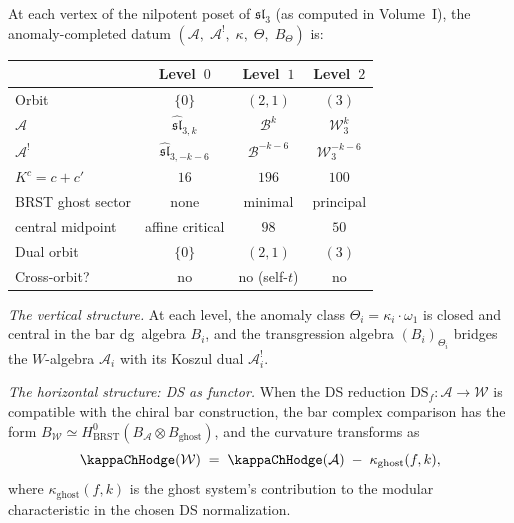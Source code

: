 \begin{construction}
\label{constr:sl3-anomaly-chain}
At each vertex of the nilpotent poset of $\mathfrak{sl}_3$
\textup{(}as computed in Volume~I\textup{)}, the
anomaly-completed datum
$(\mathcal A,\;\mathcal A^!,\;\kappa,\;\Theta,\;B_\Theta)$
is:
\begin{center}
\renewcommand{\arraystretch}{1.3}
\begin{tabular}{lccc}
& \textbf{Level~$0$} & \textbf{Level~$1$} & \textbf{Level~$2$} \\
\hline
Orbit & $\{0\}$ & $(2,1)$ & $(3)$ \\[2pt]
$\mathcal A$ &
 $\widehat{\mathfrak{sl}}_{3,k}$ &
 $\mathcal B^k$ &
 $\mathcal W_3^k$ \\[2pt]
$\mathcal A^!$ &
 $\widehat{\mathfrak{sl}}_{3,-k-6}$ &
 $\mathcal B^{-k-6}$ &
 $\mathcal W_3^{-k-6}$ \\[2pt]
$K^c=c+c'$ & $16$ & $196$ & $100$ \\[2pt]
BRST ghost sector & none & minimal & principal \\[2pt]
central midpoint & affine critical & $98$ & $50$ \\[2pt]
Dual orbit & $\{0\}$ & $(2,1)$ & $(3)$ \\[2pt]
Cross-orbit? & no & no (self-$t$) & no
\end{tabular}
\end{center}

\emph{The vertical structure.}
At each level, the anomaly class $\Theta_i=\kappa_i\cdot\omega_1$
is closed and central in the bar dg~algebra $B_i$, and the
transgression algebra $(B_i)_{\Theta_i}$ bridges the
$W$-algebra $\mathcal A_i$ with its Koszul dual
$\mathcal A_i^!$.

\emph{The horizontal structure: DS as functor.}
When the DS reduction $\mathrm{DS}_f\colon\mathcal A\to\mathcal W$
is compatible with the chiral bar construction, the bar complex
comparison has the form
$B_{\mathcal W}\simeq H^0_{\mathrm{BRST}}(B_{\mathcal A}
\otimes B_{\mathrm{ghost}})$,
and the curvature transforms as
\begin{equation}\label{eq:curvature-ds-transform}
\kappaChHodge(\mathcal W)
\;=\;
\kappaChHodge(\mathcal A)
\;-\;
\kappa_{\mathrm{ghost}}(f,k),
\end{equation}
where $\kappa_{\mathrm{ghost}}(f,k)$ is the ghost system's
contribution to the modular characteristic in the chosen DS
normalization.


\end{construction}
